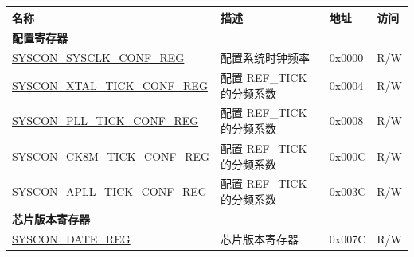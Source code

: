 \begin{longtable}{ | p{6cm} | p{7.2cm} | p{1.3cm} | p{1cm} | }
    \hline\rowcolor{lightgray}
    名称 & 描述 &  地址 & 访问 \\ \hline
    \endhead
    \multicolumn{4}{|l|}{\textbf{配置寄存器}} \\ \hline
    \hyperref[regdesc:SYSCONSYSCLKCONFREG]{SYSCON\_SYSCLK\_CONF\_REG} & 配置系统时钟频率 & 0x0000 & R/W \\ \hline
    \hyperref[regdesc:SYSCONXTALTICKCONFREG]{SYSCON\_XTAL\_TICK\_CONF\_REG} & 配置 REF\_TICK 的分频系数 & 0x0004 & R/W \\ \hline
    \hyperref[regdesc:SYSCONPLLTICKCONFREG]{SYSCON\_PLL\_TICK\_CONF\_REG} & 配置 REF\_TICK 的分频系数 & 0x0008 & R/W \\ \hline
    \hyperref[regdesc:SYSCONCK8MTICKCONFREG]{SYSCON\_CK8M\_TICK\_CONF\_REG} & 配置 REF\_TICK 的分频系数 & 0x000C & R/W \\ \hline
    \hyperref[regdesc:SYSCONAPLLTICKCONFREG]{SYSCON\_APLL\_TICK\_CONF\_REG} & 配置 REF\_TICK 的分频系数 & 0x003C & R/W \\ \hline
    \multicolumn{4}{|l|}{\textbf{芯片版本寄存器}} \\ \hline
    \hyperref[regdesc:SYSCONDATEREG]{SYSCON\_DATE\_REG} & 芯片版本寄存器 & 0x007C & R/W \\ \hline
    \end{longtable}
    